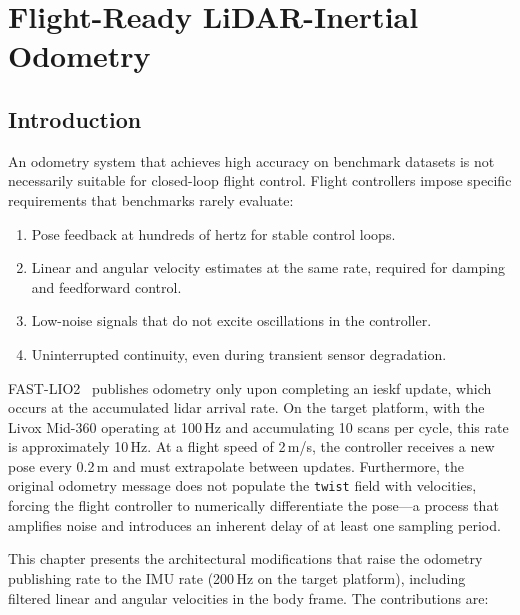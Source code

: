 \chapter{Flight-Ready LiDAR-Inertial Odometry}
\label{ch:flight-ready}

\section{Introduction}
\label{sec:fr-introduction}

An odometry system that achieves high accuracy on benchmark datasets is not
necessarily suitable for closed-loop flight control. Flight controllers impose
specific requirements that benchmarks rarely evaluate:

\begin{enumerate}
    \item Pose feedback at hundreds of hertz for stable control loops.
    \item Linear and angular velocity estimates at the same rate, required for
    damping and feedforward control.
    \item Low-noise signals that do not excite oscillations in the controller.
    \item Uninterrupted continuity, even during transient sensor degradation.
\end{enumerate}

FAST-LIO2~\cite{xu2022fastlio2} publishes odometry only upon completing an
\gls{ieskf} update, which occurs at the accumulated \gls{lidar} arrival rate. On
the target platform, with the Livox Mid-360 operating at 100\,Hz and accumulating
10 scans per cycle, this rate is approximately 10\,Hz. At a flight speed of
2\,m/s, the controller receives a new pose every 0.2\,m and must extrapolate
between updates. Furthermore, the original odometry message does not populate the
\texttt{twist} field with velocities, forcing the flight controller to numerically
differentiate the pose---a process that amplifies noise and introduces an inherent
delay of at least one sampling period.

This chapter presents the architectural modifications that raise the odometry
publishing rate to the IMU rate (200\,Hz on the target platform), including
filtered linear and angular velocities in the body frame. The contributions are:

